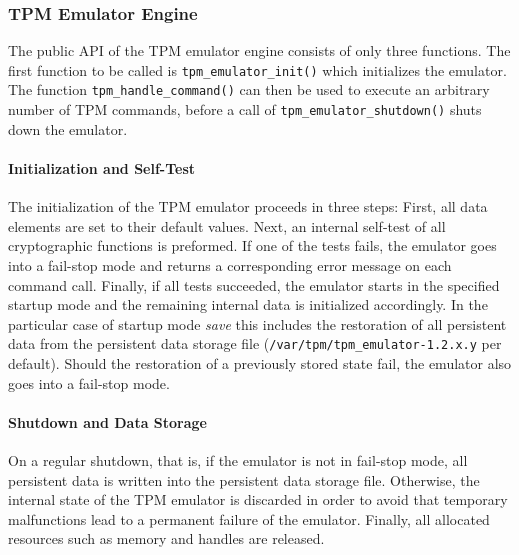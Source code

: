 \documentclass[runningheads]{llncs}
\newcommand{\file}[1]{\small\texttt{#1}\normalsize}
\newcommand{\func}[1]{\small\texttt{#1}\normalsize}
\begin{document}
\subsubsection{TPM Emulator Engine}

The public API of the TPM emulator engine consists of only three functions. The first function
to be called is \func{tpm\_emulator\_init()} which initializes the emulator. The function
\func{tpm\_\-handle\_\-command()} can then be used to execute an arbitrary number of TPM commands,
before a call of \func{tpm\_emulator\_shutdown()} shuts down the emulator.

\paragraph{Initialization and Self-Test}
The initialization of the TPM emulator proceeds in three steps:
First, all data elements are set to their default values. %
Next, an internal self-test of all cryptographic functions
is preformed. If one of the tests fails, the emulator goes into a fail-stop mode and returns
a corresponding error message on each command call. Finally, if all tests succeeded, the emulator
starts in the specified startup mode and the remaining internal data is initialized accordingly.
In the particular case of startup mode \emph{save} this includes the restoration of all persistent
data from the persistent data storage file (\file{/var/tpm/tpm\_emulator-1.2.x.y} per default).
Should the restoration of a previously stored state fail, the emulator also goes into a fail-stop
mode.

\paragraph{Shutdown and Data Storage}
On a regular shutdown, that is, if the emulator is not in fail-stop mode, all persistent data is
written into the persistent data storage file. Otherwise, the internal state of the TPM emulator
is discarded in order to avoid that temporary malfunctions lead to a permanent failure of the
emulator. Finally, all allocated resources such as memory and handles are released.
\end{document}
